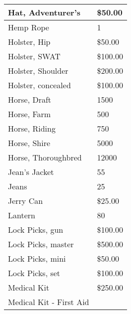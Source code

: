 \documentclass[twoside]{book}
\begin{document}
\begin{longtable}{p{1.25in}l}
  \raggedright
           Hat, Adventurer's 
  &
   \$50.00 
  \tabularnewline
  \hline
      
  \raggedright
           Hemp Rope 
  &
   1 
  \tabularnewline
  \hline
      
  \raggedright
           Holster, Hip 
  &
   \$50.00 
  \tabularnewline
  \hline
      
  \raggedright
           Holster, SWAT 
  &
   \$100.00 
  \tabularnewline
  \hline
      
  \raggedright
           Holster, Shoulder 
  &
   \$200.00 
  \tabularnewline
  \hline
      
  \raggedright
           Holster, concealed 
  &
   \$100.00 
  \tabularnewline
  \hline
      
  \raggedright
           Horse, Draft 
  &
   1500 
  \tabularnewline
  \hline
      
  \raggedright
           Horse, Farm 
  &
   500 
  \tabularnewline
  \hline
      
  \raggedright
           Horse, Riding 
  &
   750 
  \tabularnewline
  \hline
      
  \raggedright
           Horse, Shire 
  &
   5000 
  \tabularnewline
  \hline
      
  \raggedright
           Horse, Thoroughbred 
  &
   12000 
  \tabularnewline
  \hline
      
  \raggedright
           Jean's Jacket 
  &
   55 
  \tabularnewline
  \hline
      
  \raggedright
           Jeans 
  &
   25 
  \tabularnewline
  \hline
      
  \raggedright
           Jerry Can 
  &
   \$25.00 
  \tabularnewline
  \hline
      
  \raggedright
           Lantern 
  &
   80 
  \tabularnewline
  \hline
      
  \raggedright
           Lock Picks, gun 
  &
   \$100.00 
  \tabularnewline
  \hline
      
  \raggedright
           Lock Picks, master 
  &
   \$500.00 
  \tabularnewline
  \hline
      
  \raggedright
           Lock Picks, mini 
  &
   \$50.00 
  \tabularnewline
  \hline
      
  \raggedright
           Lock Picks, set 
  &
   \$100.00 
  \tabularnewline
  \hline
      
  \raggedright
           Medical Kit 
  &
   \$250.00 
  \tabularnewline
  \hline
      
  \raggedright
           Medical Kit - First Aid
           

\end{longtable}
\end{document}

